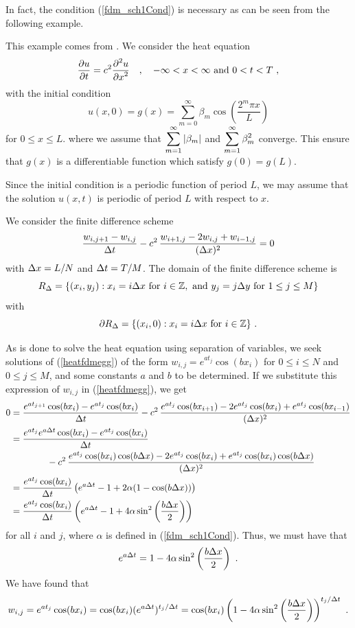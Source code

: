 In fact, the condition (\ref{fdm_sch1Cond}) is
necessary as can be seen from the following example.

\begin{egg}
This example comes from \cite{IK}.  We consider the heat equation
\[
\frac{\partial{u}}{\partial{t}} = c^2 \frac{\displaystyle \partial^{2}{u}} {\displaystyle \partial{x}^{2}} \quad , \quad
-\infty < x < \infty  \ \text{and} \ 0<t<T \ ,
\]
with the initial condition
\[
u(x,0) = g(x) = \sum_{m=0}^\infty \beta_m
\cos\left(\frac{2^m \pi x}{L}\right)
\]
for $0 \leq x \leq L$. where we assume that
$\displaystyle \sum_{m=1}^\infty|\beta_m|$ and
$\displaystyle \sum_{m=1}^\infty\beta_m^2$ converge.  This ensure that
$g(x)$ is a differentiable function which satisfy $g(0) = g(L)$.

Since the initial condition is a periodic function of period $L$, we
may assume that the solution $u(x,t)$ is periodic of period $L$
with respect to $x$.

We consider the finite difference scheme
\begin{equation}\label{heatfdmegg}
\frac{w_{i,j+1} - w_{i,j}}{\Delta{t}}  - c^2\, \frac{w_{i+1,j} - 2w_{i,j} +
w_{i-1,j}}{(\Delta{x})^2} = 0
\end{equation}
with $\Delta{x} = L/N$ and $\Delta{t} = T/M$.  The domain of the finite
difference scheme is
\[
R_\Delta = \{ (x_i,y_j) : x_i = i \Delta{x} \ \text{for} \ i \in \mathbb{Z},
\ \text{and} \ y_j = j \Delta{y} \ \text{for} \ 1 \leq j \leq M \}
\]
with
\[
\partial R_\Delta =  \{ (x_i,0) : x_i = i \Delta{x} \ \text{for} \ i \in \mathbb{Z} \}
\ .
\]

As is done to solve the heat equation using separation of variables,
we seek solutions of (\ref{heatfdmegg}) of the form
$w_{i,j} = e^{a t_j}\cos(b x_i)$ for $0\leq i \leq N$ and
$0 \leq j \leq M$, and some constants $a$ and $b$ to be determined.
If we substitute this expression of $w_{i,j}$ in (\ref{heatfdmegg}),
we get
\begin{align*}
0 &= \frac{e^{at_{j+1}}\cos(bx_i) - e^{at_j}\cos(bx_i)}{\Delta{t}}  -
c^2\, \frac{e^{at_j}\cos(bx_{i+1})  - 2 e^{at_j}\cos(bx_i) +
e^{at_j}\cos(bx_{i-1})}{(\Delta{x})^2} \\
&=\frac{e^{at_j}e^{a\Delta{t}}\cos(bx_i) - e^{at_j}\cos(bx_i)}{\Delta{t}}\\
&\qquad\qquad
- c^2\, \frac{e^{at_j}\cos(bx_i)\cos(b\Delta{x}) - 2 e^{at_j}\cos(bx_i) +
e^{at_j}\cos(bx_i)\cos(b\Delta{x})}{(\Delta{x})^2} \\
&= \frac{e^{at_j}\cos(bx_i)}{\Delta{t}} \left( e^{a\Delta{t}} - 1 + 2\alpha
(1 - \cos(b\Delta{x})) \right) \\
&= \frac{e^{at_j}\cos(bx_i)}{\Delta{t}} \left( e^{a\Delta{t}} - 1 + 4\alpha
\sin^2\left(\frac{b\Delta{x}}{2}\right) \right)
\end{align*}
for all $i$ and $j$, where $\alpha$ is defined in
(\ref{fdm_sch1Cond}).  Thus, we must have that
\[
  e^{a\Delta{t}} = 1 - 4\alpha \sin^2\left(\frac{b\Delta{x}}{2}\right) \ .
\]
We have found that
\[
w_{i,j} = e^{at_j}\cos(bx_i) = \cos(b x_i) (e^{a\Delta{t}})^{t_j/\Delta{t}}
= \cos(b x_i) \left( 1 - 4\alpha \sin^2\left(\frac{b\Delta{x}}{2}\right)
\right)^{t_j/\Delta{t}} \ .
\]


\end{egg}
